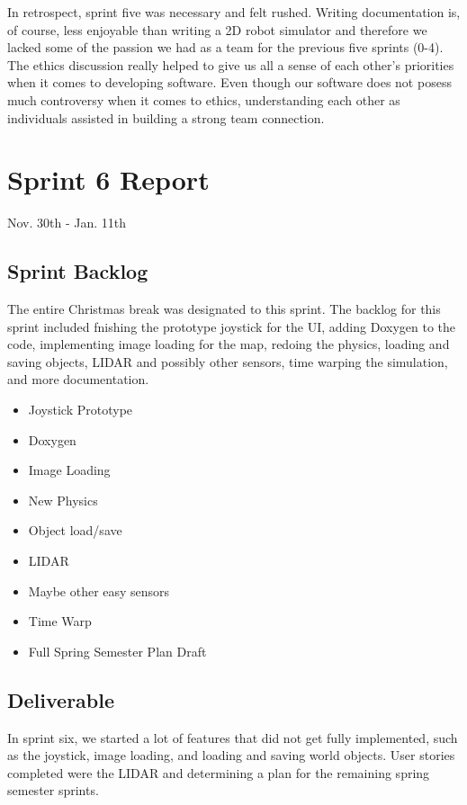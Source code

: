 In retrospect, sprint five was necessary and felt rushed. Writing documentation is, of course, less enjoyable than writing a 2D robot simulator and therefore we lacked some of the passion we had as a team for the previous five sprints (0-4). The ethics discussion really helped to give us all a sense of each other's priorities when it comes to developing software. Even though our software does not posess much controversy when it comes to ethics, understanding each other as individuals assisted in building a strong team connection.


\section{Sprint 6 Report}
Nov. 30th - Jan. 11th
\subsection{Sprint Backlog}

The entire Christmas break was designated to this sprint. The backlog for this sprint included fnishing the prototype joystick for the UI, adding Doxygen to the code, implementing image loading for the map, redoing the physics, loading and saving objects, LIDAR and possibly other sensors, time warping the simulation, and more documentation.

\begin{itemize}
	\item Joystick Prototype
	\item Doxygen	
	\item Image Loading
	\item New Physics
	\item Object load/save
	\item LIDAR
	\item Maybe other easy sensors
	\item Time Warp
	\item Full Spring Semester Plan Draft
\end{itemize}

\subsection{Deliverable}

In sprint six, we started a lot of features that did not get fully implemented, such as the joystick, image loading, and loading and saving world objects. User stories completed were the LIDAR and determining a plan for the remaining spring semester sprints.

